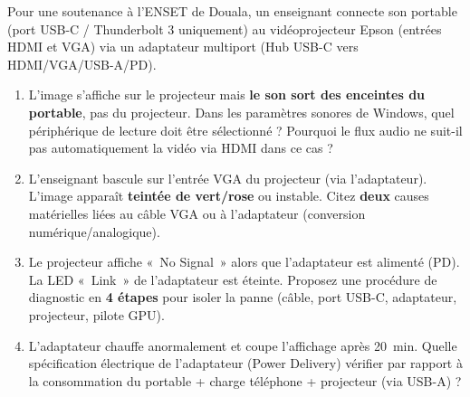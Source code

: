 \documentclass[11pt]{article}
\begin{document}
\begin{exercice}
Pour une soutenance à l'ENSET de Douala, un enseignant connecte son portable (port USB-C / Thunderbolt 3 uniquement) au vidéoprojecteur Epson (entrées HDMI et VGA) via un adaptateur multiport (Hub USB-C vers HDMI/VGA/USB-A/PD).
\begin{enumerate}
    \item L'image s'affiche sur le projecteur mais \textbf{le son sort des enceintes du portable}, pas du projecteur. Dans les paramètres sonores de Windows, quel périphérique de lecture doit être sélectionné ? Pourquoi le flux audio ne suit-il pas automatiquement la vidéo via HDMI dans ce cas ?
    \item L'enseignant bascule sur l'entrée VGA du projecteur (via l'adaptateur). L'image apparaît \textbf{teintée de vert/rose} ou instable. Citez \textbf{deux} causes matérielles liées au câble VGA ou à l'adaptateur (conversion numérique/analogique).
    \item Le projecteur affiche «~No Signal~» alors que l'adaptateur est alimenté (PD). La LED «~Link~» de l'adaptateur est éteinte. Proposez une procédure de diagnostic en \textbf{4 étapes} pour isoler la panne (câble, port USB-C, adaptateur, projecteur, pilote GPU).
    \item L'adaptateur chauffe anormalement et coupe l'affichage après 20~min. Quelle spécification électrique de l'adaptateur (Power Delivery) vérifier par rapport à la consommation du portable + charge téléphone + projecteur (via USB-A) ?
\end{enumerate}
\end{exercice}
\end{document}
